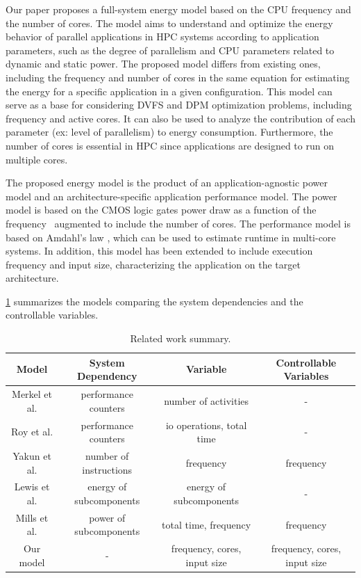 Our paper proposes a full-system energy model based on the CPU frequency and the number of cores. The model aims to understand and optimize the energy behavior of parallel applications in HPC systems according to application parameters, such as the degree of parallelism and CPU parameters related to dynamic and static power. The proposed model differs from existing ones, including the frequency and number of cores in the same equation for estimating the energy for a specific application in a given configuration. This model can serve as a base for considering DVFS and DPM optimization problems, including frequency and active cores. It can also be used to analyze the contribution of each parameter (ex: level of parallelism) to energy consumption. Furthermore, the number of cores is essential in HPC since applications are designed to run on multiple cores.

The proposed energy model is the product of an application-agnostic power model and an architecture-specific application performance model. The power model is based on the CMOS logic gates power draw as a function of the frequency~\cite{Sarwar1997CmosCalculation, Butzen2007LeakageGates} augmented to include the number of cores. The performance model is based on Amdahl's law \cite{Amdahl1967ValidityCapabilities, Eyerman2010ModelingDesign, Gustafson1988ReevaluatingLaw}, which can be used to estimate runtime in multi-core systems. In addition, this model has been extended to include execution frequency and input size, characterizing the application on the target architecture.


\cref{tab:related_work} summarizes the models comparing the system dependencies and the controllable variables.
\begin{table}[H]
	\footnotesize
	\caption{Related work summary.\label{tab1}}
	\setlength{\tabcolsep}{2.3mm}\begin{tabular}{cccc}
		\toprule
		
		\textbf{Model}  & \textbf{System Dependency}       & \textbf{Variable}                     & \textbf{Controllable Variables}         \\ \midrule
		Merkel et al. \cite{Merkel2006BalancingSystems} & performance counters    & number of activities & - \\
		Roy et al. \cite{Roy2013AnAlgorithms}&performance counters &io operations, total time    & - \\
		Yakun et al. \cite{Shao2013EnergyProcessor}&number of instructions &frequency&frequency \\
		Lewis et al. \cite{Lewis2008Run-timeSystems}&energy of subcomponents&energy of subcomponents & - \\
		Mills et al. \cite{Mills2014EnergySystems}&power of subcomponents&total time, frequency & frequency \\ 
		Our model & - & frequency, cores, input size & frequency, cores, input size\\ \bottomrule
	\end{tabular}
	\label{tab:related_work}
\end{table}

